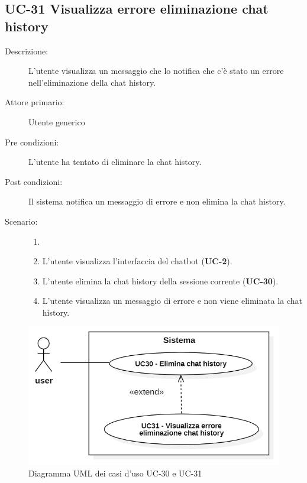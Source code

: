 \subsection{UC-31 Visualizza errore eliminazione chat history }
\begin{description}
    \item[Descrizione:] L'utente visualizza un messaggio che lo notifica che c'è stato un errore nell'eliminazione della chat history.
    \item[Attore primario:] Utente generico
    \item[Pre condizioni:] L'utente ha tentato di eliminare la chat history.
    \item[Post condizioni:] Il sistema notifica un messaggio di errore e non elimina la chat history.
    \item[Scenario:] 
    \begin{enumerate}
        \item[] 
        \item L’utente visualizza l'interfaccia del chatbot (\textbf{UC-2}).
        \item L'utente elimina la chat history della sessione corrente (\textbf{UC-30}).
        \item L'utente visualizza un messaggio di errore e non viene eliminata la chat history.
    \end{enumerate}
\end{description}

\begin{figure}[H]
    \centering
    \includegraphics[width=0.9\linewidth]{UC30-31.PNG}
    \caption{Diagramma UML dei casi d'uso UC-30 e UC-31}
    \label{fig:UC30-31}
\end{figure}

